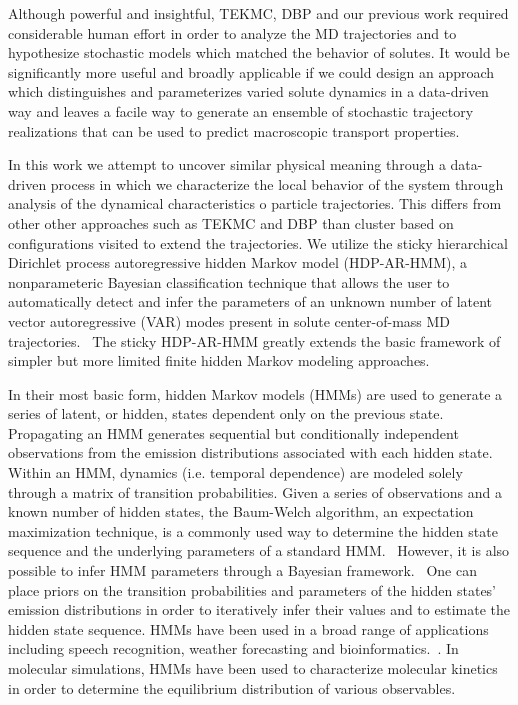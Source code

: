 \documentclass[journal=jpcbfk,manuscript=article]{achemso}
\begin{document}
  Although powerful and insightful, TEKMC, DBP and our previous work required considerable
  human effort in order to analyze the MD trajectories and to hypothesize stochastic models 
  which matched the behavior of solutes. It would be significantly more useful and broadly 
  applicable if we could design an approach which distinguishes and parameterizes varied
  solute dynamics in a data-driven way and leaves a facile way to generate an ensemble
  of stochastic trajectory realizations that can be used to predict macroscopic transport
  properties.
  
  In this work we attempt to uncover similar physical meaning through
  a data-driven process in which we characterize the local behavior of
  the system through analysis of the dynamical characteristics o
  particle trajectories.  This differs from other other approaches
  such as TEKMC and DBP than cluster based on configurations visited
  to extend the trajectories. We utilize the sticky hierarchical
  Dirichlet process autoregressive hidden Markov model (HDP-AR-HMM), a
  nonparameteric Bayesian classification technique that allows the
  user to automatically detect and infer the parameters of an unknown
  number of latent vector autoregressive (VAR) modes present in solute
  center-of-mass MD trajectories.~\cite{fox_bayesian_2010} The sticky
  HDP-AR-HMM greatly extends the basic framework of simpler but more
  limited finite hidden Markov modeling approaches.
    
  In their most basic form, hidden Markov models (HMMs) are used to generate
  a series of latent, or hidden, states dependent only on the previous state.~\cite{rabiner_tutorial_1989}
  Propagating an HMM generates sequential but conditionally independent observations from 
  the emission distributions associated with each hidden state. 
  Within an HMM, dynamics (i.e. temporal dependence) are modeled solely through  
  a matrix of transition probabilities. Given a series of observations and a known number of hidden states, the 
  Baum-Welch algorithm, an expectation maximization technique, is a commonly 
  used way to determine the hidden state sequence and the underlying parameters of
  a standard HMM.~\cite{baum_maximization_1970} However, it is also possible to infer
  HMM parameters through a Bayesian framework.~\cite{scott_bayesian_2002,jasra_markov_2005} 
  One can place priors on the transition probabilities and parameters of the hidden 
  states' emission distributions in order to iteratively infer their values and to
  estimate the hidden state sequence. HMMs have been used in a broad range of applications
  including speech recognition, weather forecasting and bioinformatics.~\cite{juang_hidden_1984,hughes_non-homogeneous_1999,yoon_hidden_2009}.
  In molecular simulations, HMMs have been used to characterize molecular kinetics
  in order to determine the equilibrium distribution of various observables.~\cite{thayer_hidden_2002,singhal_using_2004,noe_probability_2008,noe_projected_2013}
  
\end{document}
